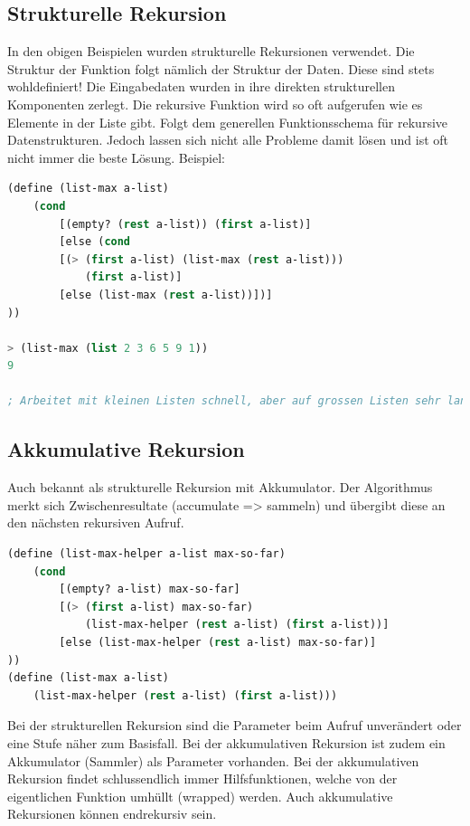 \subsection{Strukturelle Rekursion}
In den obigen Beispielen wurden strukturelle Rekursionen verwendet. Die Struktur der Funktion folgt nämlich der Struktur der Daten. Diese sind stets wohldefiniert! Die Eingabedaten wurden in ihre direkten strukturellen Komponenten zerlegt. Die rekursive Funktion wird so oft aufgerufen wie es Elemente in der Liste gibt. Folgt dem generellen Funktionsschema für rekursive Datenstrukturen. Jedoch lassen sich nicht alle Probleme damit lösen und ist oft nicht immer die beste Lösung. Beispiel:

\begin{lstlisting}[language=Lisp, caption=Strukturelle Rekursion - Beispiel Maximumssuche]
(define (list-max a-list)
	(cond
		[(empty? (rest a-list)) (first a-list)]
		[else (cond
		[(> (first a-list) (list-max (rest a-list)))
			(first a-list)]
		[else (list-max (rest a-list))])]
))

> (list-max (list 2 3 6 5 9 1))
9

; Arbeitet mit kleinen Listen schnell, aber auf grossen Listen sehr langsam. Problem: Die Lösung hat zwei Rekursionen - die Rekursionsaufrufe verdoppeln sich!
\end{lstlisting}

\subsection{Akkumulative Rekursion}
Auch bekannt als strukturelle Rekursion mit Akkumulator. Der Algorithmus merkt sich Zwischenresultate (accumulate => sammeln) und übergibt diese an den nächsten rekursiven Aufruf.

\begin{lstlisting}[language=Lisp, caption=Akkumulative Rekursion - Beispiel Maximumssuche]
(define (list-max-helper a-list max-so-far)
	(cond
		[(empty? a-list) max-so-far]
		[(> (first a-list) max-so-far)
			(list-max-helper (rest a-list) (first a-list))]
		[else (list-max-helper (rest a-list) max-so-far)]
))
(define (list-max a-list)
	(list-max-helper (rest a-list) (first a-list)))
\end{lstlisting}

Bei der strukturellen Rekursion sind die Parameter beim Aufruf unverändert oder eine Stufe näher zum Basisfall. Bei der akkumulativen Rekursion ist zudem ein Akkumulator (Sammler) als Parameter vorhanden. Bei der akkumulativen Rekursion findet schlussendlich immer Hilfsfunktionen, welche von der eigentlichen Funktion umhüllt (wrapped) werden. Auch akkumulative Rekursionen können endrekursiv sein.

